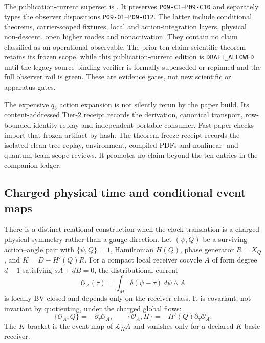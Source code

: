 \documentclass[11pt]{article}
\theoremstyle{definition}
\theoremstyle{remark}
\newcommand{\claimid}[1]{\texttt{#1}}
\begin{document}
The publication-current superset is
.  It preserves
\claimid{P09-C1}--\claimid{P09-C10} and separately types the observer
dispositions \claimid{P09-O1}--\claimid{P09-O12}.  The latter include
conditional theorems, carrier-scoped fixtures, local and action-integration
layers, physical non-descent, open higher modes and nonactivation.  They
contain no claim classified as an operational observable.
The prior ten-claim scientific theorem retains its frozen scope, while this
publication-current edition is \texttt{DRAFT\_ALLOWED} until the legacy
source-binding verifier is formally superseded or repinned and the full
observer rail is green.  These are evidence gates, not new scientific or
apparatus gates.

The expensive $q_3$ action expansion is not silently rerun by the paper build.
Its content-addressed Tier-2 receipt records the derivation, canonical
transport, row-bounded identity replay and independent portable consumer.
Fast paper checks import that frozen artifact by hash.  The theorem-freeze
receipt records the isolated clean-tree replay, environment, compiled PDFs
and nonlinear- and quantum-team scope reviews.  It promotes no claim beyond
the ten entries in the companion ledger.

\subsection{Charged physical time and conditional event maps}

There is a distinct relational construction when the clock translation is a
charged physical symmetry rather than a gauge direction.  Let
$(\psi,Q)$ be a surviving action--angle pair with
$\{\psi,Q\}=1$, Hamiltonian $H(Q)$, phase generator $R=X_Q$, and
$K=D-H'(Q)R$.  For a compact local receiver cocycle $A$ of form degree
$d-1$ satisfying $sA+dB=0$, the distributional current
\begin{equation}
  \mathcal O_A(\tau)=\int_M\delta(\psi-\tau)\,d\psi\wedge A
\end{equation}
is locally BV closed and depends only on the receiver class.  It is covariant,
not invariant by quotienting, under the charged global flows:
\begin{equation}
 \{\mathcal O_A,Q\}=-\partial_\tau\mathcal O_A,
 \qquad
 \{\mathcal O_A,H\}=-H'(Q)\partial_\tau\mathcal O_A.
\end{equation}
The $K$ bracket is the event map of $\mathcal L_KA$ and vanishes only for a
declared $K$-basic receiver.
\end{document}
